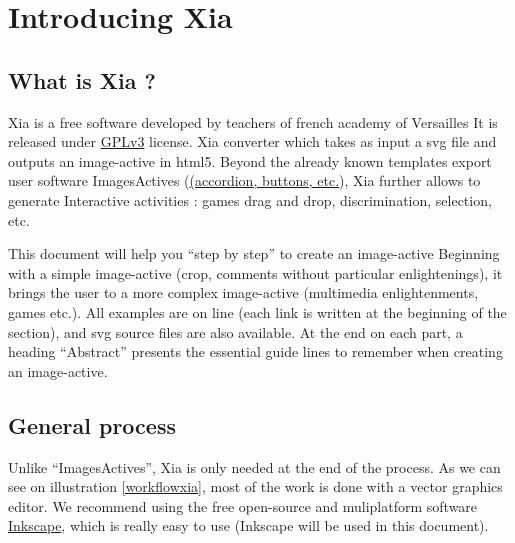 


 
 \tableofcontents
 
 
\section{Introducing Xia}

\subsection{What is Xia ?}

Xia is a free software developed by teachers of french academy of Versailles
It is released under \href{http://www.gnu.org/copyleft/gpl.html}{GPLv3} license.
Xia converter which takes as input a svg file and outputs an image-active in 
html5. Beyond the already known templates export user software ImagesActives 
(\href{http://images-actives.crdp-versailles.fr/spip.php?article11\&lang=fr}
{(accordion, buttons, etc.}), Xia further allows to generate
Interactive activities : games drag and drop, discrimination, selection, etc.

This document will help you ``step by step'' to create an image-active
Beginning with a simple image-active (crop, comments without particular 
enlightenings), it brings the user to a more complex image-active (multimedia
 enlightenments, games etc.). All examples are on line (each link is written at 
the beginning of the section), and svg source files are also available. At the end
on each part, a heading ``Abstract'' presents the essential guide lines to 
remember when creating an image-active.

\subsection{General process}

Unlike ``ImagesActives'', Xia is only needed at the end of the process.
As we can see on illustration \ref{workflowxia}, most of the work is done with 
a  vector graphics editor. We recommend using the free open-source and 
muliplatform software \href{http://www.inkscape.org/}{Inkscape}, which is 
really easy to use (Inkscape will be used in this document).

